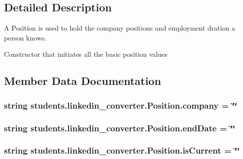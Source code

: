 \subsection{Detailed Description}
\begin{DoxyVerb}A Position is used to hold the company positions and employment dration a person knows.\end{DoxyVerb}
\begin{DoxyVerb}Constructor that initiates all the basic position values\end{DoxyVerb}
 

\subsection{Member Data Documentation}
\hypertarget{classstudents_1_1linkedin__converter_1_1_position_a4f0acf8538a488daedd9091f7f86dc8c}{
\subsubsection[{company}]{\setlength{\rightskip}{0pt plus 5cm}string students.\-linkedin\-\_\-converter.\-Position.\-company = \char`\"{}\char`\"{}\hspace{0.3cm}{\ttfamily [static]}}}\label{classstudents_1_1linkedin__converter_1_1_position_a4f0acf8538a488daedd9091f7f86dc8c}
\hypertarget{classstudents_1_1linkedin__converter_1_1_position_ab8f28f8c86b50b641ffcdd18d3f7ada0}{
\subsubsection[{end\-Date}]{\setlength{\rightskip}{0pt plus 5cm}string students.\-linkedin\-\_\-converter.\-Position.\-end\-Date = \char`\"{}\char`\"{}\hspace{0.3cm}{\ttfamily [static]}}}\label{classstudents_1_1linkedin__converter_1_1_position_ab8f28f8c86b50b641ffcdd18d3f7ada0}
\hypertarget{classstudents_1_1linkedin__converter_1_1_position_adac50b99cf25ff1739c0ef8e47790513}{
\subsubsection[{is\-Current}]{\setlength{\rightskip}{0pt plus 5cm}string students.\-linkedin\-\_\-converter.\-Position.\-is\-Current = \char`\"{}\char`\"{}\hspace{0.3cm}{\ttfamily [static]}}}\label{classstudents_1_1linkedin__converter_1_1_position_adac50b99cf25ff1739c0ef8e47790513}
